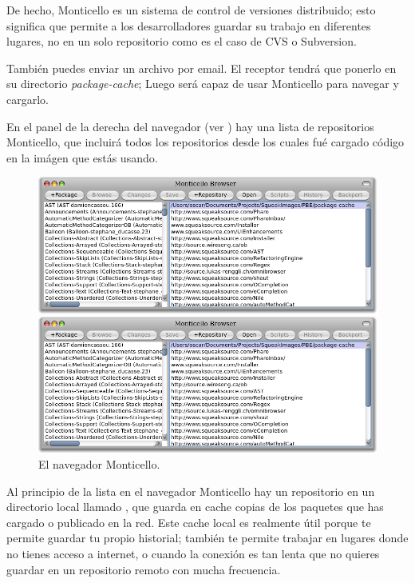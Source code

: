 \documentclass[a4paper,10pt,twoside]{book}
\begin{document}
De hecho, Monticello es un sistema de control de versiones distribuido; esto significa que permite a los desarrolladores guardar su trabajo en diferentes lugares, no en un solo repositorio como es el caso de CVS o Subversion. 
 

Tambi\'en puedes enviar un archivo  por email.
El receptor tendr\'a que ponerlo en su directorio \emph{package-cache}; Luego ser\'a capaz de usar Monticello para navegar y cargarlo.

En el panel de la derecha del navegador (ver ) hay una lista de repositorios Monticello, que incluir\'a todos los repositorios desde los cuales fu\'e cargado c\'odigo en la im\'agen que est\'as usando.

\begin{figure}[hbt]
\ifluluelse
	{\centerline {\includegraphics[width=\textwidth]{MonticelloBrowser}}}
	{\centerline {\includegraphics[scale=0.7]{MonticelloBrowser}}}
\caption{El navegador Monticello.
}
\end{figure}

Al principio de la lista en el navegador Monticello hay un repositorio en un directorio local llamado , que guarda en cache copias de los paquetes que has cargado o publicado en la red. Este cache local es realmente \'util porque te permite guardar tu propio historial; tambi\'en te permite trabajar en lugares donde no tienes acceso a internet, o cuando la conexi\'on es tan lenta que no quieres guardar en un repositorio remoto con mucha frecuencia. 
\end{document}
